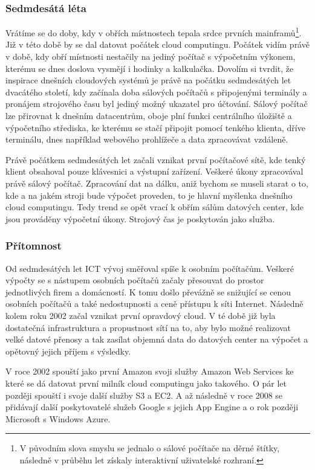 \subsubsection{Sedmdesátá léta}
Vrátíme se do doby, kdy v obřích místnostech tepala srdce prvních mainframů\footnote{V původním slova smyslu se jednalo o sálové počítače na děrné štítky, následně v průběhu let získaly interaktivní uživatelské rozhraní.}. Již v této době by se dal datovat počátek cloud computingu. Počátek vidím právě v době, kdy obří místnosti nestačily na jediný počítač s výpočetním výkonem, kterému se dnes doslova vysmějí i hodinky a kalkulačka. Dovolím si tvrdit, že inspirace dnešních cloudových systémů je právě na počátku sedmdesátých let dvacátého století, kdy začínala doba sálových počítačů s připojenými terminály a pronájem strojového času byl jediný možný ukazatel pro účtování. Sálový počítač lze přirovnat k dnešním datacentrům, oboje plní funkci centrálního úložiště a výpočetního střediska, ke kterému se stačí připojit pomocí tenkého klienta, dříve terminálu, dnes například webového prohlížeče a data zpracovávat vzdáleně.

Právě počátkem sedmdesátých let začali vznikat první počítačové sítě, kde tenký klient obsahoval pouze klávesnici a výstupní zařízení. Veškeré úkony zpracovával právě sálový počítač. Zpracování dat na dálku, aniž bychom se museli starat o to, kde a na jakém stroji bude výpočet proveden, to je hlavní myšlenka dnešního cloud computingu. Tedy trend se opět vrací k obřím sálům datových center, kde jsou prováděny výpočetní úkony. Strojový čas je poskytován jako služba.

\subsubsection{Přítomnost}
Od sedmdesátých let ICT vývoj směřoval spíše k osobním počítačům. Veškeré výpočty se s nástupem osobních počítačů začaly přesouvat do prostor jednotlivých firem a domácností. K tomu došlo převážně se snižující se cenou osobních počítačů a také nedostupnosti a ceně přístupu k síti Internet. Následně kolem roku 2002 začal vznikat první opravdový cloud. V té době již byla dostatečná infrastruktura a propustnost sítí na to, aby bylo možné realizovat velké datové přenosy a tak zasílat objemná data do datových center na výpočet a opětovný jejich příjem s výsledky.

V roce 2002 spouští jako první Amazon svoji služby Amazon Web Services ke které se dá datovat první milník cloud computingu jako takového. O pár let později spouští i svoje další služby S3 a EC2. A až následně v roce 2008 se přidávají další poskytovatelé služeb Google s jejich App Engine a o rok později Microsoft s Windows Azure.


